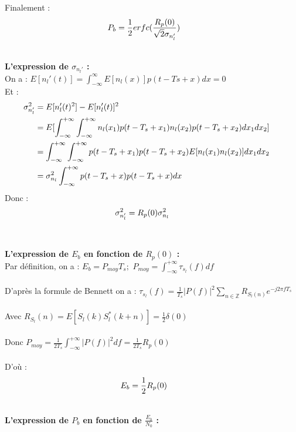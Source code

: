 \documentclass{rapport}
\begin{document}
{Finalement :
\begin{align}
    \mathllap{P_b} &= \frac12 erfc(\frac{R_p(0)}{\sqrt2 \sigma_{n_l'}})
\end{align}

\\
\textbf{L’expression de $\sigma_{n_l'}$ :}
\vspace{8}\\
On a : $E[n_l'(t)] = \int_{-\infty}^{\infty}E[n_l(x)]p(t-Ts+x)dx = 0$\\
Et :
$$
\begin{align}
    \mathllap{\sigma_{n_l'}^2} &= E[n_l'(t)^2] - E[n_l'(t)]^2\\
    \mathllap{} &=E[\int_{-\infty}^{+\infty}\int_{-\infty}^{+\infty}n_l(x_1)p(t-T_s+x_1)n_l(x_2)p(t-T_s+x_2)dx_1dx_2]\\
    \mathllap{} &=\int_{-\infty}^{+\infty}\int_{-\infty}^{+\infty}p(t-T_s+x_1)p(t-T_s+x_2)E[n_l(x_1)n_l(x_2)]dx_1dx_2\\
    \mathllap{} &=\sigma_{n_l}^2\int_{-\infty}^{+\infty}p(t-T_s+x)p(t-T_s+x)dx\\
\end{align}
$$
Donc :
\begin{align}
    \mathllap{\sigma_{n_l'}^2} &=R_p(0)\sigma_{n_l}^2
\end{align}\\

\\
\textbf{L’expression de $E_b$ en fonction de $R_p(0)$ :}
\vspace{8}\\
Par définition, on a : $E_b = P_{moy}T_s;$ $P_{moy} = \int_{-\infty}^{+\infty}\tau_{s_l}(f)df$\\\\
D'après la formule de Bennett on a : $\tau_{s_l}(f) = \frac1{T_s}|P(f)|^2\sum_{n\in\mathbb{Z}}R_{S_l(n)}e^{-j2\pi fT_s}$\\\\
Avec $R_{S_l}(n) = E[S_l(k)S_l^*(k+n)] = \frac12\delta(0)$\\\\
Donc $P_{moy} = \frac1{2T_s}\int_{-\infty}^{+\infty}|P(f)|^2df = \frac1{2T_s}R_p(0)$\\\\
D'où :
\begin{align}
    \mathllap{E_b} &=\frac12R_p(0)
\end{align}

\\
\textbf{L’expression de $P_b$ en fonction de $\frac{E_b}{N_0}$ :}
\vspace{8}\\

}
\end{document}
